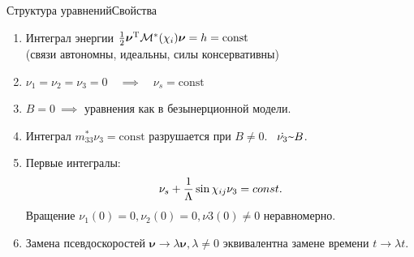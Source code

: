 \documentclass{beamer}
\newcommand{\textprop}{\raisebox{0.5ex}{\texttildelow}}
\renewcommand{\vec}[1]{\boldsymbol{\mathbf{#1}}}
\begin{document}
\begin{frame}{Структура уравнений}{Свойства}    
\begin{enumerate}
    \item Интеграл энергии \quad $\frac{1}{2}\vec{\nu}^\mathrm{T}\M^*(\chi_i)\vec{\nu} = h = \mathrm{const}$\\
    (связи автономны, идеальны, силы консервативны)
    \item $\nu_1 = \nu_2 = \nu_3 = 0 \quad \implies \quad \nu_s = \mathrm{const}$
    \item $B = 0 \ \implies$ уравнения как в безынерционной модели.
    \item Интеграл $m_{33}^*\nu_3 = \mathrm{const}$ разрушается при $B \neq 0$. \ $\dot{\nu_3} \textprop B$.
    \item Первые интегралы:
    $$\nu_s + \displaystyle\frac{\displaystyle 1}{\displaystyle \Lambda}\sin\chi_{ij}\nu_3 = const.$$
    Вращение $\nu_1(0) = 0, \nu_2(0) = 0, \nu3(0) \neq 0$ неравномерно.
    \item Замена псевдоскоростей $\vec{\nu} \rightarrow \lambda\vec{\nu}, \lambda \neq 0$ эквивалентна замене времени $t \rightarrow \lambda t$.
\end{enumerate}
\end{frame}
\end{document}
